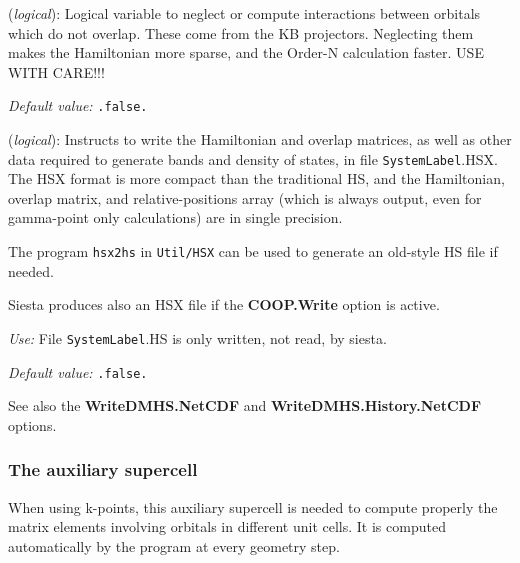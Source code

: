 \documentclass[11pt]{article}
\begin{document}
\begin{description}
\itemsep 10pt
\parsep 0pt

\item[{\bf NeglNonOverlapInt}] ({\it logical}):
Logical variable to neglect or compute interactions between orbitals
which do not overlap. These come from the KB projectors.
Neglecting them makes the Hamiltonian more sparse, and
the Order-N calculation faster.  USE WITH CARE!!!

{\it Default value:} {\tt .false.}

\item[{\bf SaveHS}] ({\it logical}):
Instructs to write the Hamiltonian and overlap matrices, as well
as other data required to generate bands and density of states,
in file {\tt SystemLabel}.HSX. The HSX format is more
compact than the traditional HS, and the Hamiltonian,
overlap matrix, and relative-positions array (which is always output,
even for gamma-point only calculations) are in single precision.

The program {\tt hsx2hs} in {\tt Util/HSX} can be used to generate
an old-style HS file if needed.

{\sc Siesta} produces also an HSX file if the {\bf COOP.Write} option
is active.

{\it Use:} File {\tt SystemLabel}.HS is only written, not read, by siesta.

{\it Default value:} {\tt .false.}

See also the {\bf WriteDMHS.NetCDF} and {\bf WriteDMHS.History.NetCDF}
options.
\end{description}

\subsubsection{The auxiliary supercell}

When using k-points, this auxiliary supercell is needed to compute properly
the matrix elements involving orbitals in different unit cells.
It is computed automatically by the program at every geometry step.
\end{document}
